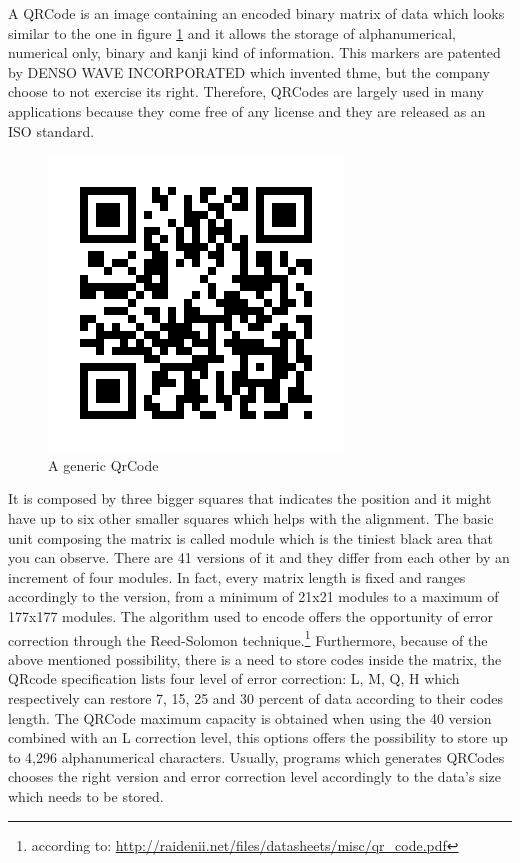 A QRCode is an image containing an encoded binary matrix of data which looks similar to the one in figure \ref{qr} and it allows the storage of alphanumerical, numerical only, binary and kanji kind of information.
This markers are patented by DENSO WAVE INCORPORATED which invented thme, but the company choose to not exercise its right.
Therefore, QRCodes are largely used in many applications because they come free of any license and they are released as an ISO standard.

\begin{figure}[hbt]
    \centering
    \includegraphics[scale=0.5]{img/qr.png}
    \caption{A generic QrCode \label{qr}}
\end{figure}

It is composed by three bigger squares that indicates the position and it might have up to six other smaller squares which helps with the alignment. The basic unit composing the matrix is called module which is the tiniest black area that you can observe. There are 41 versions of it and they differ from each other by an increment of four modules. In fact, every matrix length is fixed and ranges accordingly to the version, from a minimum of 21x21 modules to a maximum of 177x177 modules. The algorithm used to encode offers the opportunity of error correction through the Reed-Solomon technique.\footnote{ according to: \url{http://raidenii.net/files/datasheets/misc/qr_code.pdf}}
Furthermore, because of the above mentioned possibility, there is a need to store codes inside the matrix, the QRcode specification lists four level of error correction: L, M, Q, H which respectively can restore 7, 15, 25 and 30 percent of data according to their codes length.\cite{qrerror}
The QRCode maximum capacity is obtained when using the 40 version combined with an L correction level, this options offers the possibility to store up to 4,296 alphanumerical characters\cite{qrversions}.
Usually, programs which generates QRCodes chooses the right version and error correction level accordingly to the data's size which needs to be stored.

